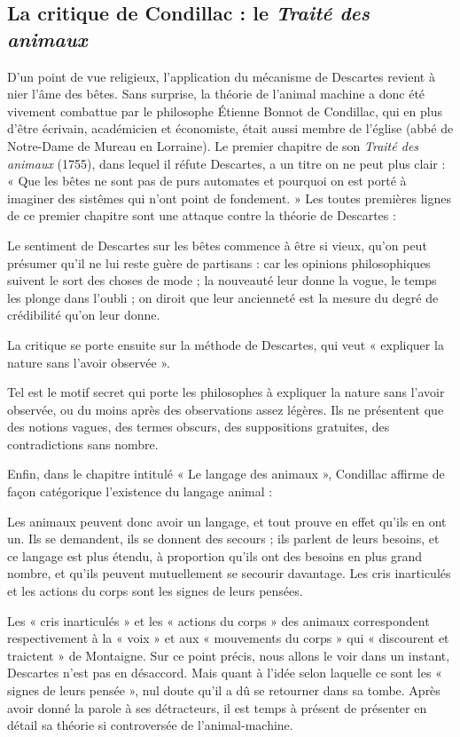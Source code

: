 \subsection{La critique de Condillac : le \textit{Traité des animaux}}
D’un point de vue religieux, l’application du mécanisme de Descartes revient à nier l’âme des bêtes. Sans surprise, la théorie de l’animal machine a donc été vivement combattue par le philosophe Étienne Bonnot de Condillac, qui en plus d’être écrivain, académicien et économiste, était aussi membre de l’église (abbé de Notre-Dame de Mureau en Lorraine). Le premier chapitre de son \textit{Traité des animaux} (1755), dans lequel il réfute Descartes, a un titre on ne peut plus clair : « Que les bêtes ne sont pas de purs automates et pourquoi on est porté à imaginer des sistêmes qui n’ont point de fondement. » Les toutes premières lignes de ce premier chapitre sont une attaque contre la théorie de Descartes :
\begin{lecture}{}
Le sentiment de Descartes sur les bêtes commence à être si vieux, qu’on peut présumer qu’il ne lui reste guère de partisans : car les opinions philosophiques suivent le sort des choses de mode ; la nouveauté leur donne la vogue, le temps les plonge dans l’oubli ; on diroit que leur ancienneté est la mesure du degré de crédibilité qu’on leur donne.
\end{lecture}
La critique se porte ensuite sur la méthode de Descartes, qui veut « expliquer la nature sans l’avoir observée ».
\begin{lecture}{}
Tel est le motif secret qui porte les philosophes à expliquer la nature sans l’avoir observée, ou du moins après des observations assez légères. Ils ne présentent que des notions vagues, des termes obscurs, des suppositions gratuites, des contradictions sans nombre.
\end{lecture}
Enfin, dans le chapitre intitulé « Le langage des animaux », Condillac affirme de façon catégorique l’existence du langage animal :
\begin{lecture}{}
Les animaux peuvent donc avoir un langage, et tout prouve en effet qu’ils en ont un. Ils se demandent, ils se donnent des secours ; ils parlent de leurs besoins, et ce langage est plus étendu, à proportion qu’ils ont des besoins en plus grand nombre, et qu’ils peuvent mutuellement se secourir davantage. Les cris inarticulés et les actions du corps sont les signes de leurs pensées.
\end{lecture}
Les « cris inarticulés » et les « actions du corps » des animaux correspondent respectivement à la « voix » et aux « mouvements du corps » qui « discourent et traictent » de Montaigne. Sur ce point précis, nous allons le voir dans un instant, Descartes n’est pas en désaccord. Mais quant à l’idée selon laquelle ce sont les « signes de leurs pensée », nul doute qu’il a dû se retourner dans sa tombe. Après avoir donné la parole à ses détracteurs, il est temps à présent de présenter en détail sa théorie si controversée de l’animal-machine.
\clearpage
